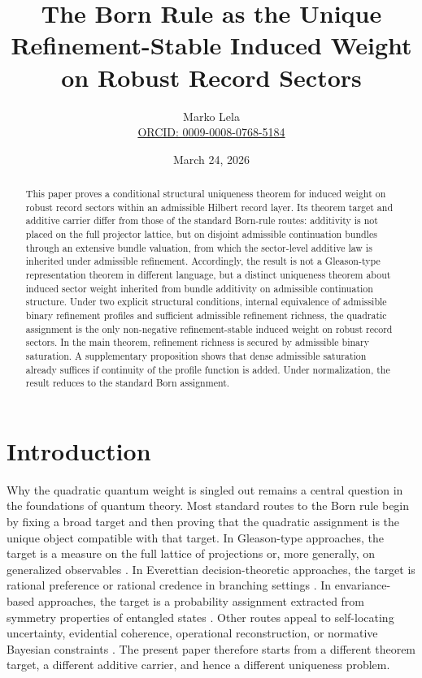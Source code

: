 \documentclass[11pt]{article}
\title{The Born Rule as the Unique Refinement-Stable Induced Weight on Robust Record Sectors}
\author{Marko Lela\\\href{https://orcid.org/0009-0008-0768-5184}{ORCID: 0009-0008-0768-5184}}
\date{March 24, 2026}
\theoremstyle{remark}
\numberwithin{equation}{section}
\begin{document}
\maketitle

\begin{abstract}
This paper proves a conditional structural uniqueness theorem for induced weight on robust record sectors within an admissible Hilbert record layer. Its theorem target and additive carrier differ from those of the standard Born-rule routes: additivity is not placed on the full projector lattice, but on disjoint admissible continuation bundles through an extensive bundle valuation, from which the sector-level additive law is inherited under admissible refinement. Accordingly, the result is not a Gleason-type representation theorem in different language, but a distinct uniqueness theorem about induced sector weight inherited from bundle additivity on admissible continuation structure. Under two explicit structural conditions, internal equivalence of admissible binary refinement profiles and sufficient admissible refinement richness, the quadratic assignment is the only non-negative refinement-stable induced weight on robust record sectors. In the main theorem, refinement richness is secured by admissible binary saturation. A supplementary proposition shows that dense admissible saturation already suffices if continuity of the profile function is added. Under normalization, the result reduces to the standard Born assignment.
\end{abstract}

\section{Introduction}
\label{sec:introduction}

Why the quadratic quantum weight is singled out remains a central question in the foundations of quantum theory. Most standard routes to the Born rule begin by fixing a broad target and then proving that the quadratic assignment is the unique object compatible with that target. In Gleason-type approaches, the target is a measure on the full lattice of projections or, more generally, on generalized observables \cite{Gleason1957,Busch2003,Caves2002}. In Everettian decision-theoretic approaches, the target is rational preference or rational credence in branching settings \cite{Deutsch1999,Wallace2010,Wallace2012}. In envariance-based approaches, the target is a probability assignment extracted from symmetry properties of entangled states \cite{Zurek2003,Zurek2005}. Other routes appeal to self-locating uncertainty, evidential coherence, operational reconstruction, or normative Bayesian constraints \cite{SebensCarroll2014,GreavesMyrvold2010,MasanesGalleyMuller2019,FuchsSchack2013}. The present paper therefore starts from a different theorem target, a different additive carrier, and hence a different uniqueness problem.
\end{document}
